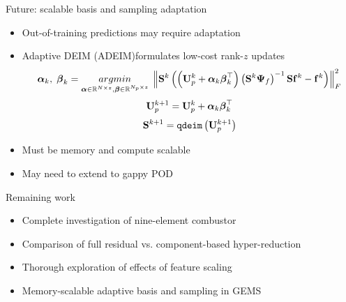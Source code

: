 \documentclass[]{beamer}
\begin{document}
\begin{frame}{Future: scalable basis and sampling adaptation}
	\begin{itemize}
		\item Out-of-training predictions may require adaptation
		\item Adaptive DEIM (ADEIM)\footnotemark[18] formulates low-cost rank-$z$ updates
		\small
		\begin{equation*}
			\boldsymbol{\alpha}_{\newtonIdx}, \; \boldsymbol{\beta}_{\newtonIdx} = \argmin{\boldsymbol{\alpha} \in \mathbb{R}^{\numDOF \times z}, \boldsymbol{\beta} \in \mathbb{R}^{\numPrimModes \times z}} \norm{\sampMat^{\newtonIdx} \left( \left( \primTrial^{\newtonIdx} + \boldsymbol{\alpha}_{\newtonIdx} \boldsymbol{\beta}_{\newtonIdx}^\top \right) \left(\sampMat^{\newtonIdx} \deimBasisRhs\right)^{-1} \sampMat \rhsDataMat^{\newtonIdx} - \rhsDataMat^{\newtonIdx} \right)}_F^2
		\end{equation*}
		\normalsize
		\begin{equation*}
			\primTrial^{\newtonIdx + 1} = \primTrial^{\newtonIdx} + \boldsymbol{\alpha}_{\newtonIdx} \boldsymbol{\beta}_{\newtonIdx}^\top
		\end{equation*}
		\begin{equation*}
			\sampMat^{\newtonIdx+1} = \texttt{qdeim}\left( \primTrial^{\newtonIdx + 1} \right)
		\end{equation*}
		\item Must be memory and compute scalable
		\item May need to extend to gappy POD
	\end{itemize}
\end{frame}

\begin{frame}{Remaining work}
	\begin{itemize}
		\item Complete investigation of nine-element combustor
		\item Comparison of full residual vs. component-based hyper-reduction
		\item Thorough exploration of effects of feature scaling
		\item Memory-scalable adaptive basis and sampling in GEMS
	\end{itemize}
\end{frame}
\end{document}
